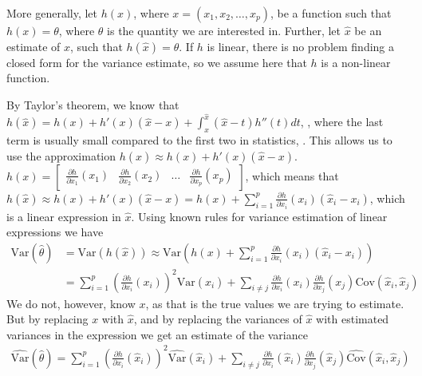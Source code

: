 \documentclass{article}
\begin{document}
More generally, let \(h(x)\), where \(x = (x_1, x_2, \dots, x_p)\), be a function such that \(h(x) = \theta\), where
\(\theta\) is the quantity we are interested in. Further, let \(\hat{x}\) be an
estimate of \(x\), such that \(h(\hat{x}) = \hat{\theta}\). If \(h\) is
linear, there is no problem finding a closed form for the variance estimate,
so we assume here that \(h\) is a non-linear function.

By Taylor's theorem, we know that \(h(\hat{x}) = h(x) + h'(x) (\hat{x} - x) + \int_x^{\hat{x}}  (\hat{x} -
t) h''(t) dt\), \cite{kalkulus}, where the last term is usually small compared to the first two
in statistics, \cite[Chapter 9]{sampReg}. This allows us to use the approximation \(h(\hat{x}) \approx h(x) +
h'(x) (\hat{x} - x)\). \(h(x) = \begin{bmatrix} \frac{\partial h}{\partial x_1}
  (x_1) & \frac{\partial h}{\partial x_2} (x_2) & \dots & \frac{\partial
    h}{\partial x_p} (x_p)\end{bmatrix}\), which means that \(h(\hat{x}) \approx
h(x) + h'(x) (\hat{x} -
x) = h(x) + \sum_{i = 1}^p \frac{\partial h}{\partial x_i} (x_i) \left( \hat{x}_i - x_i
\right)\), which is a linear expression in \(\hat{x}\). Using known rules for
variance estimation of linear expressions we have
\begin{align*}
  \mathrm{Var} \left( \hat{\theta} \right)
  &= \mathrm{Var} \left( h(\hat{x}) \right)
  \approx \mathrm{Var} \left( h(x) + \sum_{i = 1}^p \frac{\partial h}{\partial x_i} (x_i) \left( \hat{x}_i - x_i
    \right) \right) \\
    &= \sum_{i = 1}^p \left( \frac{\partial h}{\partial x_i} (x_i)  \right)^2 \mathrm{Var} \left( \hat{x}_i \right) + \sum_{i \neq j}  \frac{\partial h}{\partial x_i} (x_i)  \frac{\partial h}{\partial x_j} (x_j)  \mathrm{Cov} \left( \hat{x}_i, \hat{x}_j \right)
\end{align*}
We do not, however, know \(x\), as that is the true values we are trying to
estimate. But by replacing \(x\) with \(\hat{x}\), and by replacing the variances
of \(\hat{x}\) with estimated variances in the expression we get an
estimate of the variance
\begin{align*}
  \widehat{\mathrm{Var}} \left( \hat{\theta} \right)
  = \sum_{i = 1}^p \left( \frac{\partial h}{\partial x_i} (\hat{x}_i)  \right)^2 \widehat{\mathrm{Var}} \left( \hat{x}_i \right) + \sum_{i \neq j}  \frac{\partial h}{\partial x_i} (\hat{x}_i)  \frac{\partial h}{\partial x_j} (\hat{x}_j)  \widehat{\mathrm{Cov}} \left( \hat{x}_i, \hat{x}_j \right)
\end{align*}
\end{document}
